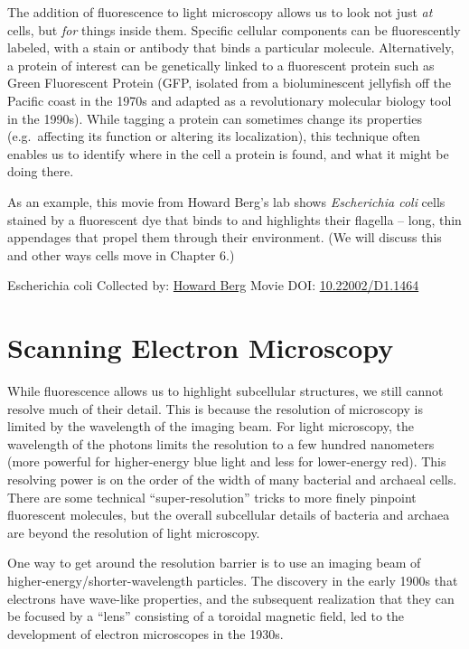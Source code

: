 \documentclass[]{tufte-book}
\begin{document}
The addition of fluorescence to light microscopy allows us to look not just \emph{at} cells, but \emph{for} things inside them. Specific cellular components can be fluorescently labeled, with a stain or antibody that binds a particular molecule. Alternatively, a protein of interest can be genetically linked to a fluorescent protein such as Green Fluorescent Protein (GFP, isolated from a bioluminescent jellyfish off the Pacific coast in the 1970s and adapted as a revolutionary molecular biology tool in the 1990s). While tagging a protein can sometimes change its properties (e.g.~affecting its function or altering its localization), this technique often enables us to identify where in the cell a protein is found, and what it might be doing there.

As an example, this movie from Howard Berg's lab \citep{bergInternet} \citep{turner2000} shows \emph{Escherichia coli} cells stained by a fluorescent dye that binds to and highlights their flagella -- long, thin appendages that propel them through their environment. (We will discuss this and other ways cells move in Chapter 6.)



\hypertarget{htmlwidget-16feab226bb7a23b7be7}{}

\label{fig:1-2}Escherichia coli Collected by: \protect\hyperlink{howard_berg}{Howard Berg} Movie DOI: \href{https://doi.org/10.22002/D1.1464}{10.22002/D1.1464}

\hypertarget{scanning-electron-microscopy}{%
\section{Scanning Electron Microscopy}\label{scanning-electron-microscopy}}

While fluorescence allows us to highlight subcellular structures, we still cannot resolve much of their detail. This is because the resolution of microscopy is limited by the wavelength of the imaging beam. For light microscopy, the wavelength of the photons limits the resolution to a few hundred nanometers (more powerful for higher-energy blue light and less for lower-energy red). This resolving power is on the order of the width of many bacterial and archaeal cells. There are some technical ``super-resolution'' tricks to more finely pinpoint fluorescent molecules, but the overall subcellular details of bacteria and archaea are beyond the resolution of light microscopy.

One way to get around the resolution barrier is to use an imaging beam of higher-energy/shorter-wavelength particles. The discovery in the early 1900s that electrons have wave-like properties, and the subsequent realization that they can be focused by a ``lens'' consisting of a toroidal magnetic field, led to the development of electron microscopes in the 1930s.
\end{document}
